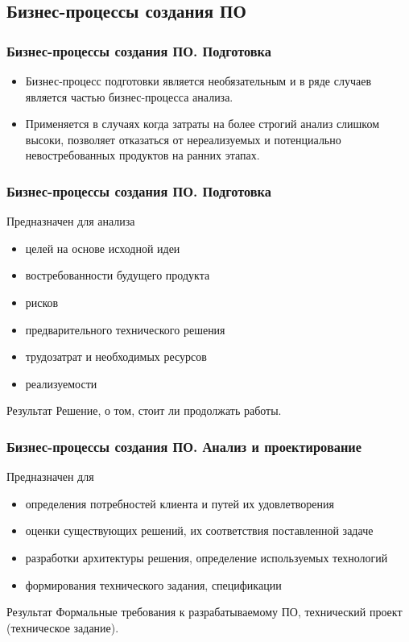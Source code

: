 \documentclass{../industrial-development}
\begin{document}
\subsection{Бизнес-процессы создания ПО}


\begin{frame} \frametitle{Бизнес-процессы создания ПО. Подготовка}
	\begin{itemize}
		\item Бизнес-процесс подготовки является необязательным и в ряде случаев является частью бизнес-процесса анализа.
		\item Применяется в случаях когда затраты на более строгий анализ слишком высоки, позволяет отказаться от нереализуемых и потенциально невостребованных продуктов на ранних этапах.
	\end{itemize}
\end{frame}
\lecturenotes


\begin{frame} \frametitle{Бизнес-процессы создания ПО. Подготовка}
	\begin{block}{Предназначен для анализа}
		\begin{itemize}
			\item целей на основе исходной идеи
			\item востребованности будущего продукта
			\item рисков
			\item предварительного технического решения
			\item трудозатрат и необходимых ресурсов
			\item реализуемости
		\end{itemize}
	\end{block}
	\begin{block}{Результат}
		Решение, о том, стоит ли продолжать работы.
	\end{block}
\end{frame}
\lecturenotes


\begin{frame} \frametitle{Бизнес-процессы создания ПО. Анализ и проектирование}
	\begin{block}{Предназначен для}
		\begin{itemize}
			\item определения потребностей клиента и путей их удовлетворения
			\item оценки существующих решений, их соответствия поставленной задаче
			\item разработки архитектуры решения, определение используемых технологий
			\item формирования технического задания, спецификации
		\end{itemize}
	\end{block}
	\begin{block}{Результат}
		Формальные требования к разрабатываемому ПО, технический проект (техническое задание).
	\end{block}
\end{frame}
\lecturenotes
\end{document}
